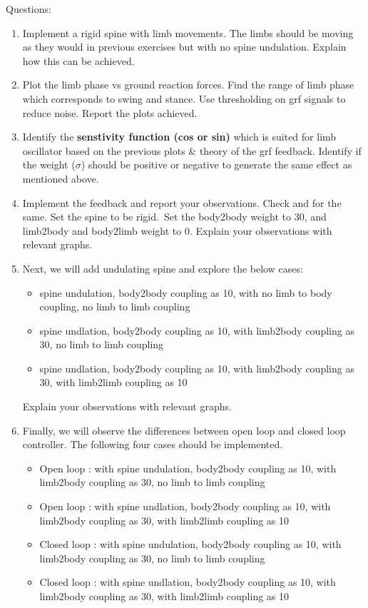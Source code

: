 \documentclass{cmc}
\begin{document}
Questions:
 \begin{enumerate}
  \item Implement a rigid spine with limb movements. The limbs should be moving as they would in
  previous exercises but with no spine undulation. Explain how this can be achieved.

  \item Plot the limb phase vs ground reaction forces. Find the range of limb phase which corresponds
  to swing and stance. Use thresholding on grf signals to reduce noise. Report the plots achieved.

  \item Identify the \textbf{senstivity function (cos or sin)} which is suited for limb oscillator based on the
  previous plots \& theory of the grf feedback. Identify if the weight ($\sigma$) should be positive or
  negative to generate the same effect as mentioned above.

  \item Implement the feedback and report your observations. Check  and  for the same.
  Set the spine to be rigid.\ Set the body2body weight to 30, and limb2body and body2limb weight to 0. Explain your observations with relevant graphs.

  \item Next, we will add undulating spine and explore the below cases:
  \begin{itemize}
    \item spine undulation, body2body coupling as 10, with no limb to body coupling, no limb to limb coupling
    \item spine undlation, body2body coupling as 10, with limb2body coupling as 30, no limb to limb coupling
    \item spine undlation, body2body coupling as 10, with limb2body coupling as 30, with limb2limb coupling as 10
  \end{itemize}
  Explain your observations with relevant graphs.

  \item Finally, we will observe the differences between open loop and closed loop controller. The following
  four cases should be implemented.
  \begin{itemize}
    \item Open loop : with spine undulation, body2body coupling as 10, with limb2body coupling as 30, no limb to limb coupling
    \item Open loop : with spine undlation, body2body coupling as 10, with limb2body coupling as 30, with limb2limb coupling as 10
    \item Closed loop : with spine undulation, body2body coupling as 10, with limb2body coupling as 30, no limb to limb coupling
    \item Closed loop : with spine undlation, body2body coupling as 10, with limb2body coupling as 30, with limb2limb coupling as 10
  \end{itemize}

  \end{enumerate}
\end{document}
